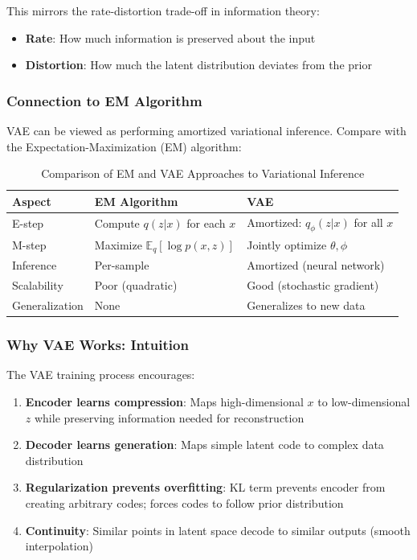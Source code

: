 \documentclass[conference]{IEEEtran}
\begin{document}
This mirrors the rate-distortion trade-off in information theory:
\begin{itemize}
    \item \textbf{Rate}: How much information is preserved about the input
    \item \textbf{Distortion}: How much the latent distribution deviates from the prior
\end{itemize}

\subsubsection{Connection to EM Algorithm}

VAE can be viewed as performing amortized variational inference. Compare with the Expectation-Maximization (EM) algorithm:

\begin{table}[!t]
\renewcommand{\arraystretch}{1.3}
\caption{Comparison of EM and VAE Approaches to Variational Inference}
\label{tab:em_vae}
\centering
\begin{tabular}{lll}
\hline
\textbf{Aspect} & \textbf{EM Algorithm} & \textbf{VAE} \\ \hline
E-step & Compute $q(z|x)$ for each $x$ & Amortized: $q_\phi(z|x)$ for all $x$ \\
M-step & Maximize $\mathbb{E}_q[\log p(x,z)]$ & Jointly optimize $\theta, \phi$ \\
Inference & Per-sample & Amortized (neural network) \\
Scalability & Poor (quadratic) & Good (stochastic gradient) \\
Generalization & None & Generalizes to new data \\ \hline
\end{tabular}
\end{table}

\subsubsection{Why VAE Works: Intuition}

The VAE training process encourages:
\begin{enumerate}
    \item \textbf{Encoder learns compression}: Maps high-dimensional $x$ to low-dimensional $z$ while preserving information needed for reconstruction
    
    \item \textbf{Decoder learns generation}: Maps simple latent code to complex data distribution
    
    \item \textbf{Regularization prevents overfitting}: KL term prevents encoder from creating arbitrary codes; forces codes to follow prior distribution
    
    \item \textbf{Continuity}: Similar points in latent space decode to similar outputs (smooth interpolation)
\end{enumerate}
\end{document}
